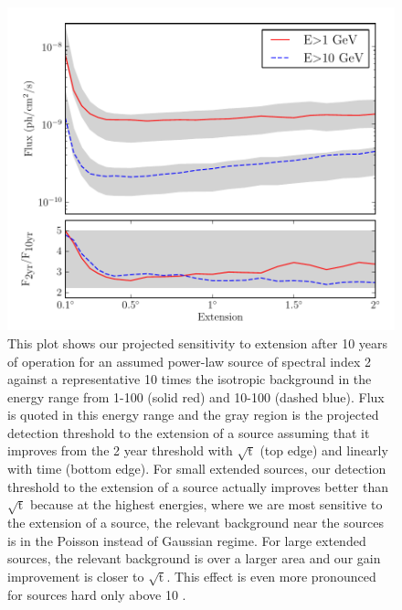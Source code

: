 \documentclass[12pt,preprint]{aastex}
\newcommand{\gev}{\text{GeV}\xspace}
\begin{document}
\begin{figure}
  \begin{center}
    \includegraphics{mc_plots/time_sensitivity.pdf}
    \end{center}
    \caption{
    This plot shows our projected sensitivity to extension after 10 years
    of operation for an assumed power-law source of spectral index
    2 against a representative 10 times the isotropic background in the
    energy range from 1-100 \gev (solid red) and 10-100 \gev (dashed
    blue). Flux is quoted in this energy range and the gray region is
    the projected detection threshold to the extension
  of a source assuming that it improves
    from the 2 year threshold
    with $\sqrt{\text{t}}$ (top edge) and linearly with time (bottom
    edge). For small extended sources, our detection threshold to the extension
    of a source actually improves better than $\sqrt{\text{t}}$
    because at the highest energies, where we are most sensitive to the
    extension of a source, the relevant background near the sources is in
    the Poisson instead of Gaussian regime.  For large extended sources,
    the relevant background is over a larger area and our gain
    improvement is closer to $\sqrt{\text{t}}$.  This effect is
    even more pronounced for sources hard only above 10 \gev.
    }\label{time_sensitivity}
  \end{figure}
\end{document}
